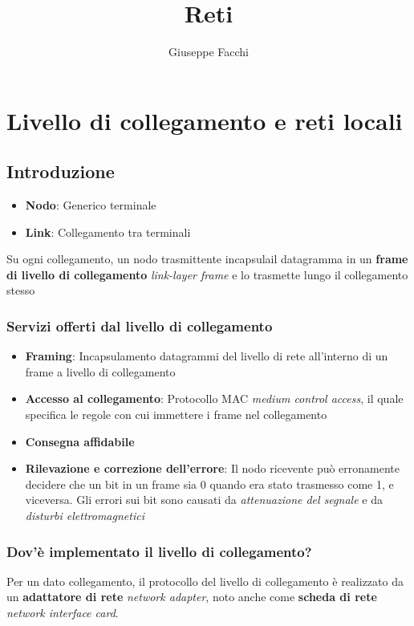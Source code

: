 \documentclass[12pt]{article}
\title{Reti}
\author{Giuseppe Facchi}
\date{}
\begin{document}
    \maketitle

    \newpage
    \tableofcontents    
    \newpage

    \section{Livello di collegamento e reti locali}
    \subsection{Introduzione}

    \begin{itemize}
        \item   \textbf{Nodo}: Generico terminale
        \item   \textbf{Link}: Collegamento tra terminali
    \end{itemize}
    Su ogni collegamento, un nodo trasmittente incapsulail datagramma in un \textbf{frame di livello di collegamento}
    \textit{link-layer frame} e lo trasmette lungo il collegamento stesso

    \subsubsection{Servizi offerti dal livello di collegamento}
    \begin{itemize}
        \item{\textbf{Framing}: Incapsulamento datagrammi del livello di rete all'interno di un frame a livello di collegamento}
        \item{\textbf{Accesso al collegamento}: Protocollo MAC \textit{medium control access}, il quale specifica le regole con cui immettere i frame nel collegamento}
        \item{\textbf{Consegna affidabile}}
        \item{\textbf{Rilevazione e correzione dell'errore}: Il nodo ricevente può erronamente decidere che un bit in un frame sia 0 quando era stato trasmesso come 1, e viceversa. 
        Gli errori sui bit sono causati da \textit{attenuazione del segnale} e da \textit{disturbi elettromagnetici}}
    \end{itemize}

    \subsubsection{Dov'è implementato il livello di collegamento?}
    Per un dato collegamento, il protocollo del livello di collegamento è realizzato da un \textbf{adattatore di rete} \textit{network adapter}, 
    noto anche come \textbf{scheda di rete} \textit{network interface card}.
    
\end{document}
